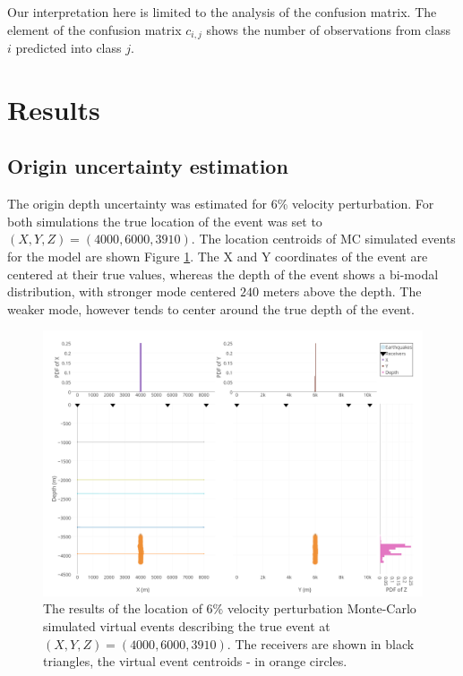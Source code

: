 \documentclass[letterpaper,11pt]{article}
\begin{document}
Our interpretation here is limited to the analysis of the confusion matrix. The element of the confusion matrix $c_{i,j}$ shows the number of observations from class $i$ predicted into class $j$.


\section*{Results}
\subsection*{Origin uncertainty estimation}
The origin depth uncertainty was estimated for $6$\% velocity perturbation. For both simulations the true location of the event was set to $(X,Y,Z) = (4000,6000,3910)$. The location centroids of MC simulated events for the model are shown Figure \ref{fig:sigma6}. The X and Y coordinates of the event are centered at their true values, whereas the depth of the event shows a bi-modal distribution, with stronger mode centered $240$ meters above the depth. The weaker mode, however tends to center around the true depth of the event.
\begin{figure}[htb]
\begin{center}
\includegraphics[width=0.6\linewidth,angle=0]{./AntonBiryukov_bibtex/Figure1_6pct.png}
\end{center}
\vspace{-4mm}
\caption{The results of the location of $6$\% velocity perturbation Monte-Carlo simulated virtual events describing the true event at $(X, Y, Z) = (4000, 6000, 3910)$. The receivers are shown in black triangles, the virtual event centroids - in orange circles.}
\label{fig:sigma6}
\end{figure}
\end{document}
